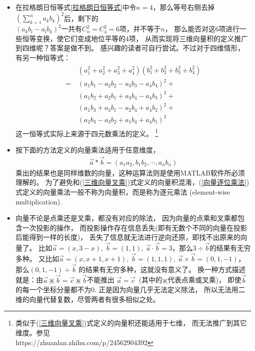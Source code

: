 \begin{itemize}[leftmargin=\inteval{\myitemleftmargin}pt,itemsep=
   \inteval{\myitemitempsep}pt,topsep=\inteval{\myitemtopsep}pt]
以上恒等式其实是$ n $维拉格朗日恒等式的特例：
\begin{gather}\label{拉格朗日恒等式}
    \left(\sum_{k=1}^{n}a_k^2 \right) \left(\sum_{k=1}^{n}b_k^2 \right)=\left( 
    \sum_{k=1}^{n}a_kb_k\right)^2 +\sum_{1\leq k<l\leq n }\left( 
    a_kb_l-a_lb_k\right)^2 \geq 0  
\end{gather}

\item 在拉格朗日恒等式\eqref{拉格朗日恒等式}中令$ n=4 $，那么等号右侧去掉
$ \left( \sum\limits_{k=1}^{n}a_kb_k\right)^2 $后，剩下的 \\
$ \left( a_kb_l-a_lb_k\right)^2 $一共有$ C_n^2=C_4^2=6 $项，并不等于$ n $，
那么能否对这6项进行一些恒等变换，使它们变成地位平等的4项，
从而实现将三维向量积的定义推广到四维呢？答案是做不到。
感兴趣的读者可自行尝试。不过对于四维情形，有另一种恒等式：
\begin{align}\label{四元数乘法导出的恒等式}
 \begin{aligned}   
    &(a_1^2+a_2^2+a_3^2+a_4^2)(b_1^2+b_2^2+b_3^2+b_4^2) \\
    =\ &(a_1b_1-a_2b_2-a_3b_3-a_4b_4)^2+\\
    &(a_1b_2+a_2b_1+a_3b_4-a_4b_3)^2+\\
    &(a_1b_3+a_3b_1-a_2b_4+a_4b_2)^2+\\
    &(a_2b_3-a_3b_2+a_1b_4+a_4b_1)^2
 \end{aligned}
\end{align}
这一恒等式实际上来源于四元数乘法的定义。
\footnote{ 类似于(\ref{三维向量叉乘})式定义的向量积还能适用于七维，
    而无法推广到其它维度。参见 \\
https://zhuanlan.zhihu.com/p/24562904392 }

\item 按下面的方法定义的向量乘法适用于任意维度，
\begin{gather}\label{向量逐位乘法}
    \vec{a}*\vec{b}=(a_1a_2,b_1b_2,\cdots,a_nb_n)
\end{gather}
乘出的结果也是同样维数的向量，这种运算法则是使用MATLAB软件所必须理解的。
为了避免和(\ref{三维向量叉乘})式定义的向量积混淆，(\ref{向量逐位乘法})
式定义的向量乘法一般不称为向量积，而是称为逐元乘法
(element-wise multiplication). 

\item 向量不论是点乘还是叉乘，都没有对应的除法，
因为向量的点乘和叉乘都包含一次投影的操作，
而投影操作存在信息丢失(即有无数个不同的向量在投影后能得到一样的长度)，
丢失了信息就无法进行逆向还原，即找不出原来的向量了。
比如$ \vec{a}=(x,3-x),\ \vec{b}=(1,1),\ 
\vec{a}\cdot \vec{b}=3 $，那么$ 3\div \vec{b} $的结果有无穷多种。
又比如$ \vec{a}=(x,x+1,x+1),\ \vec{b}=(1,1,1),\ 
\vec{a}\times\vec{b}=(0,1,-1) $，那么$ (0,1,-1) \div \vec{b} $
的结果有无穷多种，这就没有意义了。
换一种方式描述就是：由$ \vec{a}\divideontimes 
\vec{b}=\vec{c}\divideontimes \vec{b} $不能推出
$ \vec{a}=\vec{c} $\ (其中的$ \divideontimes $代表点乘或叉乘)，
即使$ \vec{b} $的每一个坐标分量都不为0. 正是因为向量几乎无法定义除法，
所以无法用二维的向量代替复数，尽管两者有很多相似之处。


\end{itemize}
